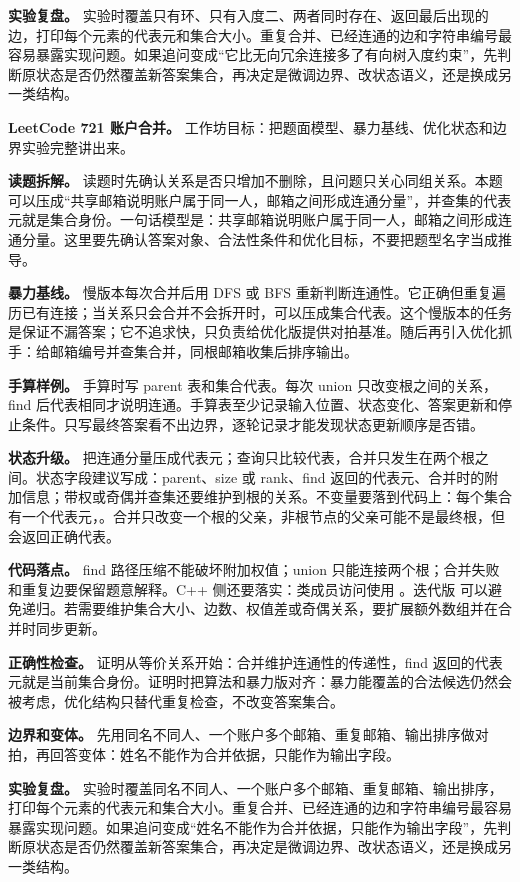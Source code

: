 \textbf{实验复盘。} 实验时覆盖只有环、只有入度二、两者同时存在、返回最后出现的边，打印每个元素的代表元和集合大小。重复合并、已经连通的边和字符串编号最容易暴露实现问题。如果追问变成“它比无向冗余连接多了有向树入度约束”，先判断原状态是否仍然覆盖新答案集合，再决定是微调边界、改状态语义，还是换成另一类结构。

\noindent\textbf{LeetCode 721 账户合并。} 工作坊目标：把题面模型、暴力基线、优化状态和边界实验完整讲出来。

\textbf{读题拆解。} 读题时先确认关系是否只增加不删除，且问题只关心同组关系。本题可以压成“共享邮箱说明账户属于同一人，邮箱之间形成连通分量”，并查集的代表元就是集合身份。一句话模型是：共享邮箱说明账户属于同一人，邮箱之间形成连通分量。这里要先确认答案对象、合法性条件和优化目标，不要把题型名字当成推导。

\textbf{暴力基线。} 慢版本每次合并后用 DFS 或 BFS 重新判断连通性。它正确但重复遍历已有连接；当关系只会合并不会拆开时，可以压成集合代表。这个慢版本的任务是保证不漏答案；它不追求快，只负责给优化版提供对拍基准。随后再引入优化抓手：给邮箱编号并查集合并，同根邮箱收集后排序输出。

\textbf{手算样例。} 手算时写 parent 表和集合代表。每次 union 只改变根之间的关系，find 后代表相同才说明连通。手算表至少记录输入位置、状态变化、答案更新和停止条件。只写最终答案看不出边界，逐轮记录才能发现状态更新顺序是否错。

\textbf{状态升级。} 把连通分量压成代表元；查询只比较代表，合并只发生在两个根之间。状态字段建议写成：parent、size 或 rank、find 返回的代表元、合并时的附加信息；带权或奇偶并查集还要维护到根的关系。不变量要落到代码上：每个集合有一个代表元，。合并只改变一个根的父亲，非根节点的父亲可能不是最终根，但  会返回正确代表。

\textbf{代码落点。} find 路径压缩不能破坏附加权值；union 只能连接两个根；合并失败和重复边要保留题意解释。C++ 侧还要落实：类成员访问使用 。迭代版  可以避免递归。若需要维护集合大小、边数、权值差或奇偶关系，要扩展额外数组并在合并时同步更新。

\textbf{正确性检查。} 证明从等价关系开始：合并维护连通性的传递性，find 返回的代表元就是当前集合身份。证明时把算法和暴力版对齐：暴力能覆盖的合法候选仍然会被考虑，优化结构只替代重复检查，不改变答案集合。

\textbf{边界和变体。} 先用同名不同人、一个账户多个邮箱、重复邮箱、输出排序做对拍，再回答变体：姓名不能作为合并依据，只能作为输出字段。

\textbf{实验复盘。} 实验时覆盖同名不同人、一个账户多个邮箱、重复邮箱、输出排序，打印每个元素的代表元和集合大小。重复合并、已经连通的边和字符串编号最容易暴露实现问题。如果追问变成“姓名不能作为合并依据，只能作为输出字段”，先判断原状态是否仍然覆盖新答案集合，再决定是微调边界、改状态语义，还是换成另一类结构。

